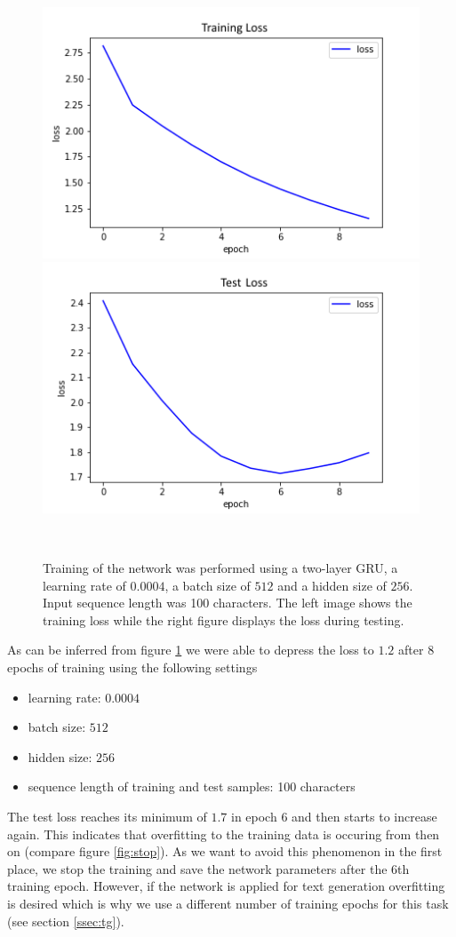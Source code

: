\documentclass[11pt,a4paper,bibliography=totocnumbered,listof=totocnumbered]{scrartcl}
\begin{document}
\begin{figure}[H]
   \begin{minipage}{\textwidth}
     \centering
     \includegraphics[width=.4\textwidth]{loss_train_hs256_slow}
     \includegraphics[width=.4\textwidth]{loss_test_hs256_slow}
     \caption{Training of the network was performed using a two-layer GRU, a learning rate of $0.0004$, a batch size of $512$ and a hidden size of $256$. Input sequence length was 100 characters. The left image shows the training loss while the right figure displays the loss during testing.}
     \label{fig:loss1}
   \end{minipage}\\[1em]   
\end{figure}

As can be inferred from figure \ref{fig:loss1} we were able to depress the loss to $1.2$ after $8$ epochs of training using the following settings
\begin{itemize}
	\item learning rate: $0.0004$
	\item batch size: $512$
	\item hidden size: $256$
	\item sequence length of training and test samples: 100 characters
\end{itemize}
The test loss reaches its minimum of $1.7$ in epoch $6$ and then starts to increase again. This indicates that overfitting to the training data is occuring from then on (compare figure \ref{fig:stop}). As we want to avoid this phenomenon in the first place, we stop the training and save the network parameters after the $6$th training epoch. However, if the network is applied for text generation overfitting is desired which is why we use a different number of training epochs for this task (see section \ref{ssec:tg}).
\end{document}
